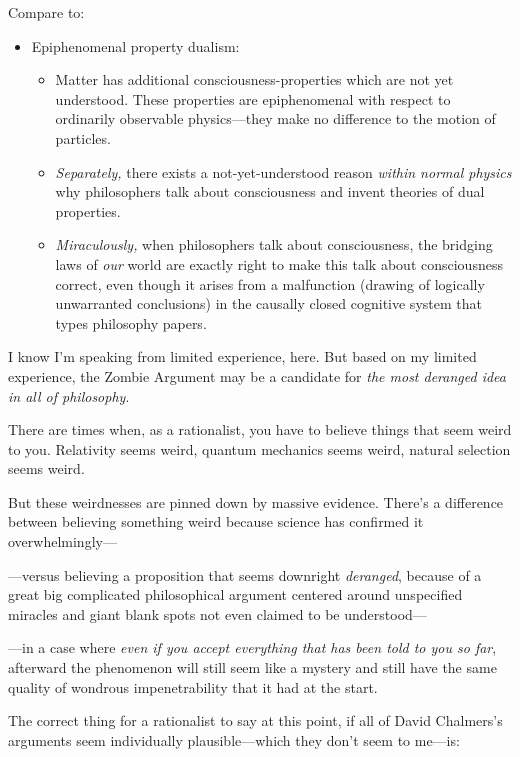 {
 Compare to:}

\begin{itemize}
  \item
{
  Epiphenomenal property dualism:
\begin{itemize}
\item  Matter has additional
consciousness-properties which are not yet understood. These properties
are epiphenomenal with respect to ordinarily observable physics---they
make no difference to the motion of particles.
\item
  \textit{Separately,}
there exists a not-yet-understood reason \textit{within normal physics}
why philosophers talk about consciousness and invent theories of dual
properties.
\item
  \textit{Miraculously,} when philosophers talk about
consciousness, the bridging laws of \textit{our} world are exactly
right to make this talk about consciousness correct, even though it
arises from a malfunction (drawing of logically unwarranted
conclusions) in the causally closed cognitive system that types
philosophy papers.
\end{itemize}
}
\end{itemize}

{
 I know I'm speaking from limited experience, here.
But based on my limited experience, the Zombie Argument may be a
candidate for \textit{the most deranged idea in all of philosophy}.}

{
 There are times when, as a rationalist, you have to believe things
that seem weird to you. Relativity seems weird, quantum mechanics seems
weird, natural selection seems weird.}

{
 But these weirdnesses are pinned down by massive evidence.
There's a difference between believing something weird
because science has confirmed it overwhelmingly---}

{
 {}---versus believing a proposition that seems downright
\textit{deranged}, because of a great big complicated philosophical
argument centered around unspecified miracles and giant blank spots not
even claimed to be understood---}

{
 {}---in a case where \textit{even if you accept everything that
has been told to you so far}, afterward the phenomenon will still seem
like a mystery and still have the same quality of wondrous
impenetrability that it had at the start.}

{
 The correct thing for a rationalist to say at this point, if all
of David Chalmers's arguments seem individually
plausible---which they don't seem to me---is:}

